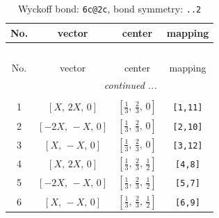 \documentclass[fleqn,8pt]{jsarticle}
\begin{document}
\renewcommand{\arraystretch}{1.2}
\begin{longtable}{cccc}
\caption{Wyckoff bond: {\tt 6c@2c}, bond symmetry: {\tt ..2}}
 \\
 \hline \hline
No. & vector & center & mapping \\ \hline \endfirsthead

\multicolumn{3}{l}{\tablename\ \thetable{}} \\
 \hline \hline
No. & vector & center & mapping \\ \hline \endhead

 \hline \hline
\multicolumn{3}{r}{\footnotesize\it continued ...} \\ \endfoot

 \hline \hline
\multicolumn{3}{r}{} \\ \endlastfoot

1 & $\left[ X,\, 2 X,\, 0 \right]$ & $\left[ \frac{1}{3},\, \frac{2}{3},\, 0 \right]$ & {\tt [1,11]} \\ \hline
2 & $\left[ - 2 X,\, - X,\, 0 \right]$ & $\left[ \frac{1}{3},\, \frac{2}{3},\, 0 \right]$ & {\tt [2,10]} \\ \hline
3 & $\left[ X,\, - X,\, 0 \right]$ & $\left[ \frac{1}{3},\, \frac{2}{3},\, 0 \right]$ & {\tt [3,12]} \\ \hline
4 & $\left[ X,\, 2 X,\, 0 \right]$ & $\left[ \frac{1}{3},\, \frac{2}{3},\, \frac{1}{2} \right]$ & {\tt [4,8]} \\ \hline
5 & $\left[ - 2 X,\, - X,\, 0 \right]$ & $\left[ \frac{1}{3},\, \frac{2}{3},\, \frac{1}{2} \right]$ & {\tt [5,7]} \\ \hline
6 & $\left[ X,\, - X,\, 0 \right]$ & $\left[ \frac{1}{3},\, \frac{2}{3},\, \frac{1}{2} \right]$ & {\tt [6,9]} \\
\end{longtable}
\renewcommand{\arraystretch}{1.2}
\end{document}
